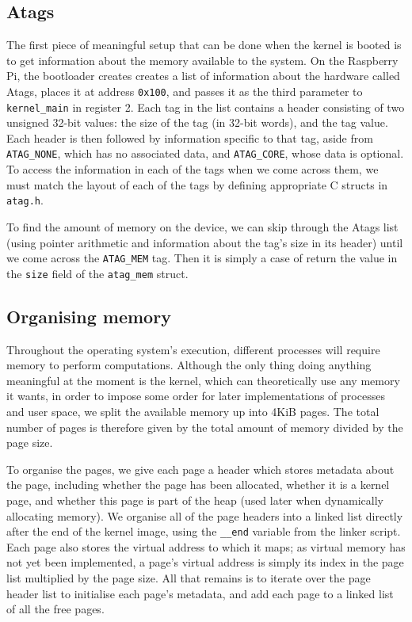 \documentclass[10pt,a4paper]{article}
\newcommand{\code}[1]{\texttt{#1}}
\begin{document}
\subsection{Atags}
The first piece of meaningful setup that can be done when the kernel is booted
is to get information about the memory available to the system. On the Raspberry
Pi, the bootloader creates creates a list of information about the hardware
called Atags, places it at address \code{0x100}, and passes it as the third
parameter to \code{kernel\_main} in register 2. Each tag in the list contains a
header consisting of two unsigned 32-bit values: the size of the tag (in 32-bit
words), and the tag value. Each header is then followed by information specific
to that tag, aside from \code{ATAG\_NONE}, which has no associated data, and
\code{ATAG\_CORE}, whose data is optional. To access the information in each of
the tags when we come across them, we must match the layout of each of the tags
\cite{atags} by defining appropriate C structs in \code{atag.h}.

To find the amount of memory on the device, we can skip through the Atags list
(using pointer arithmetic and information about the tag's size in its header)
until we come across the \code{ATAG\_MEM} tag. Then it is simply a case of
return the value in the \code{size} field of the \code{atag\_mem} struct.

\subsection{Organising memory}
Throughout the operating system's execution, different processes will require
memory to perform computations. Although the only thing doing anything
meaningful at the moment is the kernel, which can theoretically use any memory
it wants, in order to impose some order for later implementations of processes
and user space, we split the available memory up into 4KiB pages. The total
number of pages is therefore given by the total amount of memory divided by the
page size.

To organise the pages, we give each page a header which stores metadata about
the page, including whether the page has been allocated, whether it is a kernel
page, and whether this page is part of the heap (used later when dynamically
allocating memory). We organise all of the page headers into a linked list
directly after the end of the kernel image, using the \code{\_\_end} variable
from the linker script. Each page also stores the virtual address to which it
maps; as virtual memory has not yet been implemented, a page's virtual address is
simply its index in the page list multiplied by the page size. All that remains
is to iterate over the page header list to initialise each page's metadata, and
add each page to a linked list of all the free pages.
\end{document}
